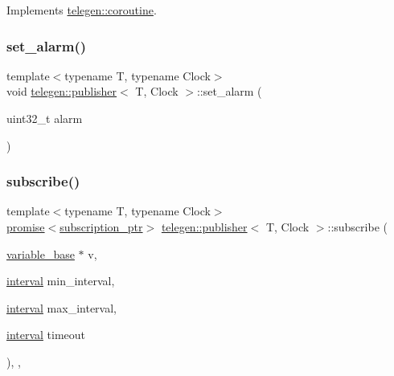 Implements \hyperlink{structtelegen_1_1coroutine_a2a7408a5b9474af3e59128934e3a5c00}{telegen\+::coroutine}.

\mbox{\label{classtelegen_1_1publisher_a551b3f77b7ac7be7157cd7cf78cc2983}} 
\subsubsection{\texorpdfstring{set\+\_\+alarm()}{set\_alarm()}}
{\footnotesize\ttfamily template$<$typename T, typename Clock$>$ \\
void \hyperlink{classtelegen_1_1publisher}{telegen\+::publisher}$<$ T, Clock $>$\+::set\+\_\+alarm (\begin{DoxyParamCaption}\item[{uint32\+\_\+t}]{alarm }\end{DoxyParamCaption})\hspace{0.3cm}{\ttfamily [inline]}}

\mbox{\label{classtelegen_1_1publisher_abb9ec30f9b0859e34111dc02fe8b52bd}} 
\subsubsection{\texorpdfstring{subscribe()}{subscribe()}}
{\footnotesize\ttfamily template$<$typename T, typename Clock$>$ \\
\hyperlink{namespacetelegen_a9dd802bb5d30cf96b0c616750d43ae86}{promise}$<$\hyperlink{namespacetelegen_a27c822534a5231fe1c523c81e8768afb}{subscription\+\_\+ptr}$>$ \hyperlink{classtelegen_1_1publisher}{telegen\+::publisher}$<$ T, Clock $>$\+::subscribe (\begin{DoxyParamCaption}\item[{\hyperlink{classtelegen_1_1variable__base}{variable\+\_\+base} $\ast$}]{v,  }\item[{\hyperlink{namespacetelegen_ad925de2d0a99bc43918533abf0457344}{interval}}]{min\+\_\+interval,  }\item[{\hyperlink{namespacetelegen_ad925de2d0a99bc43918533abf0457344}{interval}}]{max\+\_\+interval,  }\item[{\hyperlink{namespacetelegen_ad925de2d0a99bc43918533abf0457344}{interval}}]{timeout }\end{DoxyParamCaption})\hspace{0.3cm}{\ttfamily [inline]}, {\ttfamily [override]}, {\ttfamily [virtual]}}



